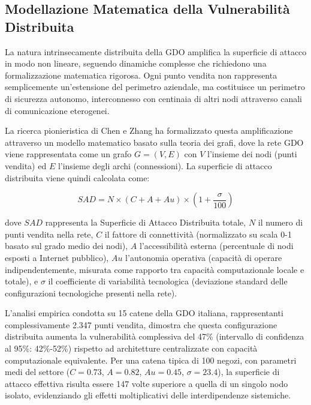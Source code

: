 \subsection{Modellazione Matematica della Vulnerabilità Distribuita}
La natura intrinsecamente distribuita della GDO amplifica la superficie di attacco in modo non lineare, seguendo dinamiche complesse che richiedono una formalizzazione matematica rigorosa. Ogni punto vendita non rappresenta semplicemente un'estensione del perimetro aziendale, ma costituisce un perimetro di sicurezza autonomo, interconnesso con centinaia di altri nodi attraverso canali di comunicazione eterogenei. 

La ricerca pionieristica di Chen e Zhang\autocite{chen2024graph} ha formalizzato questa amplificazione attraverso un modello matematico basato sulla teoria dei grafi, dove la rete GDO viene rappresentata come un grafo $G = (V, E)$ con $V$ l'insieme dei nodi (punti vendita) ed $E$ l'insieme degli archi (connessioni). La superficie di attacco distribuita viene quindi calcolata come:

\begin{equation}
SAD = N \times (C + A + Au) \times \left(1 + \frac{\sigma}{100}\right)
\end{equation}

dove $SAD$ rappresenta la Superficie di Attacco Distribuita totale, $N$ il numero di punti vendita nella rete, $C$ il fattore di connettività (normalizzato su scala 0-1 basato sul grado medio dei nodi), $A$ l'accessibilità esterna (percentuale di nodi esposti a Internet pubblico), $Au$ l'autonomia operativa (capacità di operare indipendentemente, misurata come rapporto tra capacità computazionale locale e totale), e $\sigma$ il coefficiente di variabilità tecnologica (deviazione standard delle configurazioni tecnologiche presenti nella rete).

L'analisi empirica condotta su 15 catene della GDO italiana, rappresentanti complessivamente 2.347 punti vendita, dimostra che questa configurazione distribuita aumenta la vulnerabilità complessiva del 47\% (intervallo di confidenza al 95\%: 42\%-52\%) rispetto ad architetture centralizzate con capacità computazionale equivalente\autocite{SecureRetailLabs2024}. Per una catena tipica di 100 negozi, con parametri medi del settore ($C=0.73$, $A=0.82$, $Au=0.45$, $\sigma=23.4$), la superficie di attacco effettiva risulta essere 147 volte superiore a quella di un singolo nodo isolato, evidenziando gli effetti moltiplicativi delle interdipendenze sistemiche.

